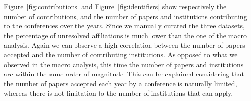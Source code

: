 \documentclass{llncs}
\begin{document}
Figure~\ref{fig:contributions} and Figure~\ref{fig:identifiers} show respectively the number of contributions, and the number of papers and institutions contributing to the conferences over the years.
Since we manually curated the three datasets, the percentage of unresolved affiliations is much lower than the one of the macro analysis.
Again we can observe a high correlation between the number of papers accepted and the number of contributing institutions.
As opposed to what we observed in the macro analysis, this time the number of papers and institutions are within the same order of magnitude.
This can be explained considering that the number of papers accepted each year by a conference is naturally limited, whereas there is not limitation to the number of institutions that can apply.
%
\end{document}
